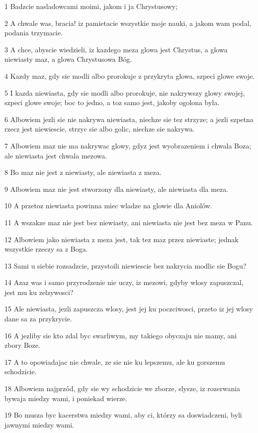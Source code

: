 \par 1 Badzcie nasladowcami moimi, jakom i ja Chrystusowy;
\par 2 A chwale was, bracia! iz pamietacie wszystkie moje nauki, a jakom wam podal, podania trzymacie.
\par 3 A chce, abyscie wiedzieli, iz kazdego meza glowa jest Chrystus, a glowa niewiasty maz, a glowa Chrystusowa Bóg.
\par 4 Kazdy maz, gdy sie modli albo prorokuje z przykryta glowa, szpeci glowe swoje.
\par 5 I kazda niewiasta, gdy sie modli albo prorokuje, nie nakrywszy glowy swojej, szpeci glowe swoje; boc to jedno, a toz samo jest, jakoby ogolona byla.
\par 6 Albowiem jezli sie nie nakrywa niewiasta, niechze sie tez strzyze; a jezli szpetna rzecz jest niewiescie, strzyc sie albo golic, niechze sie nakrywa.
\par 7 Albowiem maz nie ma nakrywac glowy, gdyz jest wyobrazeniem i chwala Boza; ale niewiasta jest chwala mezowa.
\par 8 Bo maz nie jest z niewiasty, ale niewiasta z meza.
\par 9 Albowiem maz nie jest stworzony dla niewiasty, ale niewiasta dla meza.
\par 10 A przetoz niewiasta powinna miec wladze na glowie dla Aniolów.
\par 11 A wszakze maz nie jest bez niewiasty, ani niewiasta nie jest bez meza w Panu.
\par 12 Albowiem jako niewiasta z meza jest, tak tez maz przez niewiaste; jednak wszystkie rzeczy sa z Boga.
\par 13 Sami u siebie rozsadzcie, przystoili niewiescie bez nakrycia modlic sie Bogu?
\par 14 Azaz was i samo przyrodzenie nie uczy, iz mezowi, gdyby wlosy zapuszczal, jest mu ku zelzywosci?
\par 15 Ale niewiasta, jezli zapuszcza wlosy, jest jej ku poczciwosci, przeto iz jej wlosy dane sa za przykrycie.
\par 16 A jezliby sie kto zdal byc swarliwym, my takiego obyczaju nie mamy, ani zbory Boze.
\par 17 A to opowiadajac nie chwale, ze sie nie ku lepszemu, ale ku gorszemu schodzicie.
\par 18 Albowiem najprzód, gdy sie wy schodzicie we zborze, slysze, iz rozerwania bywaja miedzy wami, i poniekad wierze.
\par 19 Bo musza byc kacerstwa miedzy wami, aby ci, którzy sa doswiadczeni, byli jawnymi miedzy wami.
